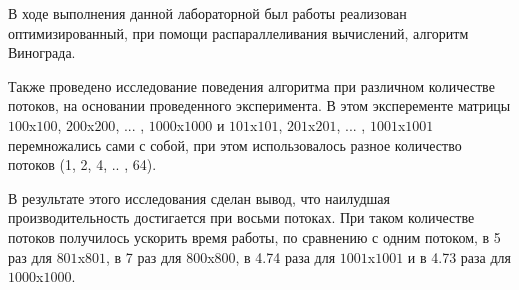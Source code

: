\documentclass[12pt]{report}
\begin{document}
	В ходе выполнения данной лабораторной был работы реализован оптимизированный, при помощи распараллеливания вычислений, алгоритм Винограда. 
	
	Также проведено исследование поведения алгоритма при различном количестве потоков, на основании проведенного эксперимента. В этом эксперементе матрицы $100$x$100$, $200$x$200$, ... , $1000$x$1000$ и $101$x$101$, $201$x$201$, ... , $1001$x$1001$ перемножались сами с собой, при этом использовалось разное количество потоков (1, 2, 4, .. , 64).
	
	В результате этого исследования сделан вывод, что наилудшая производительность достигается при восьми потоках. При таком количестве потоков получилось ускорить время работы, по сравнению с одним потоком, в 5 раз для $801$x$801$, в 7 раз для $800$x$800$, в 4.74 раза для $1001$x$1001$ и в 4.73 раза для $1000$x$1000$.
	
	
	 
	
\end{document}
